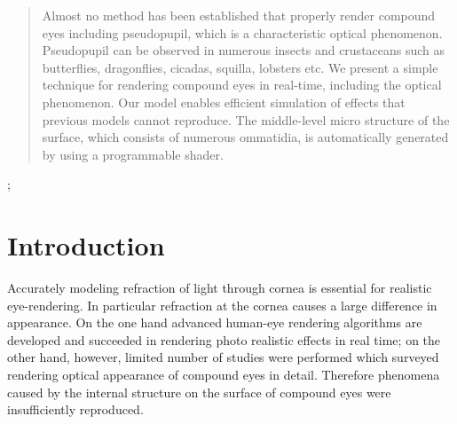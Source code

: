 
\maketitle

\begin{abstract}

Almost no method has been established that properly render compound eyes including pseudopupil, which is a characteristic optical phenomenon.
 Pseudopupil can be observed in numerous insects and crustaceans such as butterflies, dragonflies, cicadas, squilla, lobsters etc. 
We present a simple technique for rendering compound eyes in real-time, including the optical phenomenon. Our model enables efficient simulation of effects that previous models cannot reproduce. 
The middle-level micro structure of the surface, which consists of numerous ommatidia, is automatically generated by using a programmable shader.


\end{abstract}

\begin{CRcatlist}
  ;
\end{CRcatlist}

\keywordlist


\TOGlinkslist


\copyrightspace

\section{Introduction}

Accurately modeling refraction of light through cornea is essential for realistic eye-rendering.
In particular refraction at the cornea causes a large difference in appearance.
On the one hand advanced human-eye rendering algorithms are developed and succeeded in rendering photo realistic effects in real time; on the other hand, however, limited number of studies were performed which surveyed rendering optical appearance of compound eyes in detail. 
Therefore phenomena caused by the internal structure on the surface of compound eyes were insufficiently reproduced.

